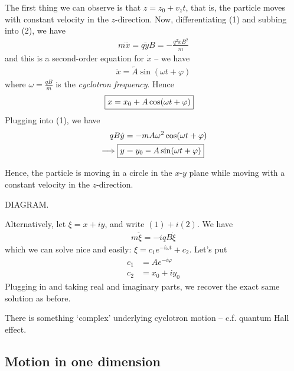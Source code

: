 \documentclass{../template/note}
\begin{document}
    The first thing we can observe is that \(z = z_0 + v_zt\), that is, the particle moves with constant velocity in the \(z\)-direction. Now, differentiating (1) and subbing into (2), we have
    \begin{align*}
        m \dddot{x} = q \ddot{y} B = -\frac{q^2\dot x B^2}{m}
    \end{align*}
    and this is a second-order equation for \(\dot x\) -- we have
    \begin{align*}
        \dot x = \tilde{A} \sin(\omega t + \varphi)
    \end{align*}
    where \(\omega = \frac{qB}{m}\) is the \emph{cyclotron frequency}. Hence
    \begin{align*}
        \Aboxed{x = x_0 + A \cos(\omega t + \varphi)}
    \end{align*}
    Plugging into (1), we have
    \begin{align*}
        qB \dot y &= -mA \omega^2 \cos(\omega t + \varphi) \\
        \implies \Aboxed{y &= y_0 - A \sin(\omega t + \varphi)}
    \end{align*}
    
    Hence, the particle is moving in a circle in the \(x\)-\(y\) plane while moving with a constant velocity in the \(z\)-direction.

    DIAGRAM.

    Alternatively, let \(\xi = x + iy\), and write \((1) + i(2)\). We have
    \begin{align*}
        m \ddot \xi = -iqB \dot \xi
    \end{align*}
    which we can solve nice and easily: \(\xi = c_1 e^{-i\omega t} + c_2\). Let's put
    \begin{align*}
        c_1 &= Ae^{-i\varphi} \\
        c_2 &= x_0 + iy_0
    \end{align*}
    Plugging in and taking real and imaginary parts, we recover the exact same solution as before.

    \begin{remark*}
        There is something `complex' underlying cyclotron motion -- c.f. quantum Hall effect.
    \end{remark*}
    
    \subsection{Motion in one dimension}
\end{document}
